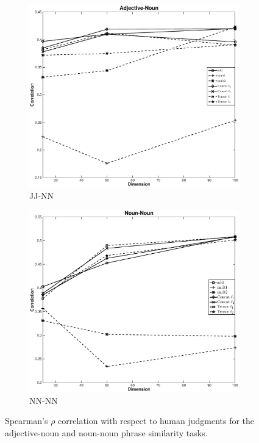 \documentclass[11pt,letterpaper]{article}
\begin{document}
\begin{figure}[t!]
	\begin{center}
	\begin{subfigure}{\columnwidth}
		\centering
		\includegraphics[width=\columnwidth,keepaspectratio=true]{./adj_nn.eps}	
		\caption{\small JJ-NN}
		\label{fig:jj_nn_result}			
	\end{subfigure}
	\begin{subfigure}{\columnwidth}
		\centering
		\includegraphics[width=\columnwidth,keepaspectratio=true]{./nn_nn.eps}		
		\caption {\small NN-NN}
		\label{fig:nn_nn_result}
	\end{subfigure}
	\end{center}
	\caption{Spearman's $\rho$ correlation with respect to human judgments for the adjective-noun and noun-noun phrase similarity tasks.}
	\label{fig:correlation}
\end{figure}
\end{document}

